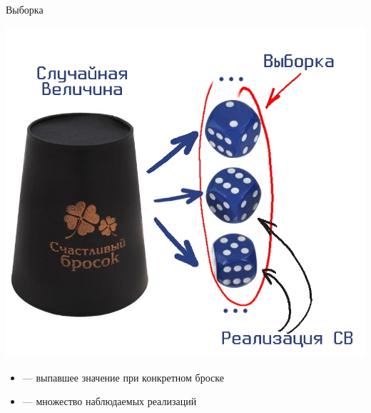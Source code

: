 \documentclass[11pt,pdf,utf8,hyperref={unicode},aspectratio=169]{beamer}
\begin{document}
\begin{frame}{Выборка}
    \begin{multicols}{2}
        \begin{center}
            \includegraphics[height=0.8\textheight]{СВ.png}
        \end{center}

        \begin{itemize}
            \item {} --- выпавшее значение при конкретном броске
            \item {} --- множество наблюдаемых реализаций
        \end{itemize}
    \end{multicols}
\end{frame}
\end{document}
